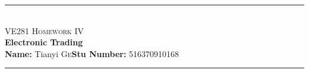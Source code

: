 \newcommand{\HRule}{\rule{\linewidth}{0.5mm}}
{
\center

\HRule \\[0.4cm]
\textsc{\huge VE281 Homework IV}\\[0.4cm]
{\Large\textbf{Electronic Trading}}\\[0.4cm]
{\large \textbf{Name:} Tianyi  \textsc{Ge}\quad \textbf{Stu Number:} 516370910168}\\[0.2cm]
\HRule \\[1.5cm]
}